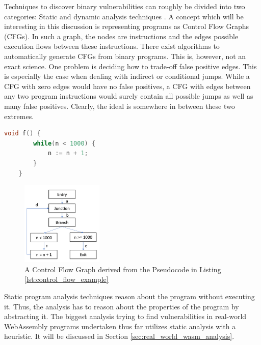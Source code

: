 \documentclass[sigconf]{acmart}
\begin{document}
Techniques to discover binary vulnerabilities can roughly be divided into two categories: Static and dynamic analysis techniques \cite{shoshitaishvili_sok_2016}. A concept which will be interesting in this discussion is representing programs as Control Flow Graphs (CFGs). In such a graph, the nodes are instructions and the edges possible execution flows between these instructions. There exist algorithms to automatically generate CFGs from binary programs. This is, however, not an exact science. One problem is deciding how to trade-off false positive edges. This is especially the case when dealing with indirect or conditional jumps. While a CFG with zero edges would have no false positives, a CFG with edges between any two program instructions would surely contain all possible jumps as well as many false positives. Clearly, the ideal is somewhere in between these two extremes.

\begin{lstlisting}[language=C++, label=lst:control_flow_example, caption={This pseudocode corresponds to the control flow graph in Figure \ref{fig:vuln_example_redirect_control_flow}}]
	void f() {
		while(n < 1000) {
			n := n + 1;	
		}
	}
\end{lstlisting}

\begin{figure}[h]
  \centering
  \includegraphics[height=4cm]{control-flow-graph}
  \caption{A Control Flow Graph derived from the Pseudocode in Listing \ref{lst:control_flow_example}}  
\label{fig:vuln_example_redirect_control_flow}
\end{figure}

Static program analysis techniques reason about the program without executing it. Thus, the analysis has to reason about the properties of the program by abstracting it. The biggest analysis trying to find vulnerabilities in real-world WebAssembly programs undertaken thus far utilizes static analysis with a heuristic. It will be discussed in Section \ref{sec:real_world_wasm_analysis}.
\end{document}
